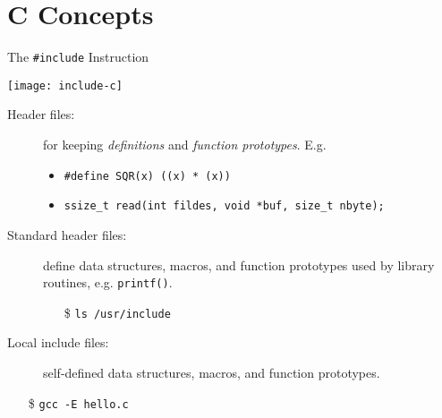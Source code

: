 \mode*
\section{C Concepts}

\begin{frame}[fragile]{The \texttt{\#include} Instruction}
  \begin{center}
    \texttt{[image: include-c]}
  \end{center}
\begin{description}
\item[Header files:] for keeping \emph{definitions} and \emph{function prototypes}. E.g.
  \begin{itemize}
  \item \texttt{#define SQR(x) ((x) * (x))}
  \item \texttt{ssize_t read(int fildes, void *buf, size_t nbyte);}
  \end{itemize}
\item[Standard header files:] define data structures, macros, and function
  prototypes used by library routines, e.g. \texttt{printf()}.
  \begin{itemize}
  \item[\$] \texttt{ls /usr/include}
  \end{itemize}
\item[Local include files:] self-defined data structures, macros, and
  function prototypes.
\end{description}
\begin{itemize}
\item[\$] \texttt{gcc -E hello.c}
\end{itemize}
\end{frame}

